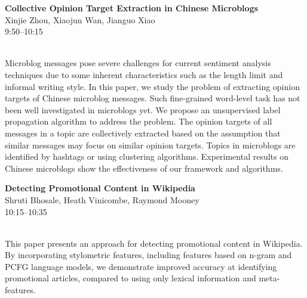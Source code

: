 \documentclass[twoside,makeidx]{book}
\begin{document}
\par\vspace{2em}\noindent%
\begin{minipage}{\linewidth}%
\begin{center}
\textbf{\normalsize Collective Opinion Target Extraction in Chinese Microblogs}\\
\normalsize  Xinjie Zhou,  Xiaojun Wan,  Jianguo Xiao\\
{\small 9:50--10:15}\\
\end{center}
\end{minipage}\\[0.5em]
\nopagebreak%
\noindent%
{\small Microblog messages pose severe challenges for current sentiment analysis techniques due to some inherent characteristics such as the length limit and informal writing style. In this paper, we study the problem of extracting opinion targets of Chinese microblog messages. Such fine-grained word-level task has not been well investigated in microblogs yet. We propose an unsupervised label propagation algorithm to address the problem. The opinion targets of all messages in a topic are collectively extracted based on the assumption that similar messages may focus on similar opinion targets. Topics in microblogs are identified by hashtags or using clustering algorithms. Experimental results on Chinese microblogs show the effectiveness of our framework and algorithms.}
\par\vspace{2em}\noindent%
\begin{minipage}{\linewidth}%
\begin{center}
\textbf{\normalsize Detecting Promotional Content in Wikipedia}\\
\normalsize  Shruti Bhosale,  Heath Vinicombe,  Raymond Mooney\\
{\small 10:15--10:35}\\
\end{center}
\end{minipage}\\[0.5em]
\nopagebreak%
\noindent%
{\small This paper presents an approach for detecting promotional content in Wikipedia. By incorporating stylometric features, including features based on n-gram and PCFG language models, we demonstrate improved accuracy at identifying promotional articles, compared to using only lexical information and meta-features.}
\clearpage
\end{document}
